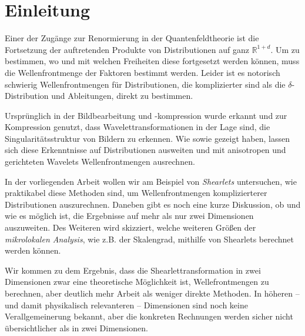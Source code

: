 
\chapter{Einleitung} %
\label{sec:einleitung_physics}
Einer der Zugänge zur Renormierung in der Quantenfeldtheorie ist die Fortsetzung der auftretenden Produkte von Distributionen auf ganz $\mathbb{R}^{1+d}$. Um zu bestimmen, wo und mit welchen Freiheiten diese fortgesetzt werden können, muss die Wellenfrontmenge der Faktoren bestimmt werden. Leider ist es notorisch schwierig Wellenfrontmengen für Distributionen, die komplizierter sind als die $\delta$-Distribution und Ableitungen, direkt zu bestimmen.

Ursprünglich in der Bildbearbeitung und -kompression wurde erkannt und zur Kompression genutzt, dass Wavelettransformationen in der Lage sind, die Singularitätsstruktur von Bildern zu erkennen.
Wie \textcite {Kutyniok2008} sowie \textcite
{Candes2005} gezeigt haben, lassen sich diese Erkenntnisse auf Distributionen ausweiten und mit anisotropen und gerichteten Wavelets Wellenfrontmengen ausrechnen.

In der vorliegenden Arbeit wollen wir am Beispiel von \emph{Shearlets} untersuchen, wie praktikabel diese Methoden sind, um Wellenfrontmengen komplizierterer Distributionen auszurechnen. Daneben gibt es noch eine kurze Diskussion, ob und wie es möglich ist, die Ergebnisse auf mehr als nur zwei Dimensionen auszuweiten.
Des Weiteren wird skizziert, welche weiteren Größen der \emph{mikrolokalen Analysis}, wie z.B. der Skalengrad, mithilfe von Shearlets berechnet werden können.

Wir kommen zu dem Ergebnis, dass die Shearlettransformation in zwei Dimensionen zwar eine theoretische Möglichkeit ist, Wellefrontmengen zu berechnen, aber deutlich mehr Arbeit als weniger direkte Methoden. In höheren -- und damit physikalisch relevanteren -- Dimensionen sind noch keine Verallgemeinerung bekannt, aber die konkreten Rechnungen werden sicher nicht übersichtlicher als in zwei Dimensionen.


